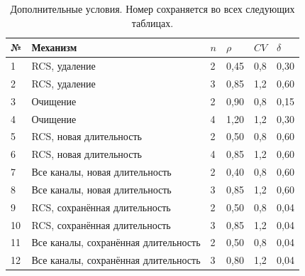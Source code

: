 \documentclass[a4paper,12pt]{article}
\begin{document}
\begin{table}[!htbp]
\centering\small\setlength{\tabcolsep}{2pt}
\begin{tabular}{@{}p{0.76cm}p{7.65cm}p{1.04cm}p{1.89cm}p{1.89cm}p{1.89cm}@{}}
\toprule
№ & Механизм & $n$ & $\rho$ & $CV$ & $\delta$ \\
\midrule
1 & RCS, удаление & 2 & 0,45 & 0,8 & 0,30 \\
2 & RCS, удаление & 3 & 0,85 & 1,2 & 0,60 \\
3 & Очищение & 2 & 0,90 & 0,8 & 0,15 \\
4 & Очищение & 4 & 1,20 & 1,2 & 0,30 \\
5 & RCS, новая длительность & 2 & 0,50 & 0,8 & 0,60 \\
6 & RCS, новая длительность & 4 & 0,85 & 1,2 & 0,60 \\
7 & Все каналы, новая длительность & 2 & 0,40 & 0,8 & 0,60 \\
8 & Все каналы, новая длительность & 3 & 0,85 & 1,2 & 0,60 \\
9 & RCS, сохранённая длительность & 2 & 0,50 & 0,8 & 0,04 \\
10 & RCS, сохранённая длительность & 3 & 0,85 & 1,2 & 0,04 \\
11 & Все каналы, сохранённая длительность & 2 & 0,50 & 0,8 & 0,04 \\
12 & Все каналы, сохранённая длительность & 3 & 0,80 & 1,2 & 0,04 \\
\bottomrule
\end{tabular}
\caption{Дополнительные условия. Номер сохраняется во всех следующих таблицах.}
\label{tab:parameters}
\end{table}
\end{document}
